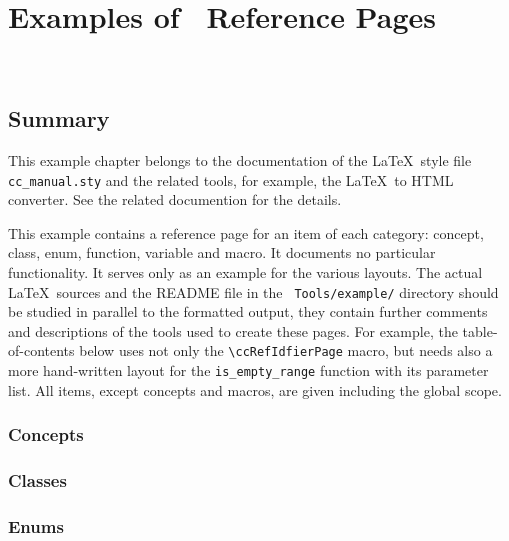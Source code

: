 
\chapter{Examples of \CC\ Reference Pages}
\\

\section*{Summary}

This example chapter belongs to the documentation of the \LaTeX\ style
file {\tt cc\_manual.sty} and the related tools, for example, the
\LaTeX\ to HTML converter. See the related documention for the details.

This example contains a reference page for an item of each category:
concept, class, enum, function, variable and macro. It documents no
particular functionality. It serves only as an example for the various
layouts. The actual \LaTeX\ sources and the README file in the {\tt
  Tools/example/} directory should be studied in parallel to the
formatted output, they contain further comments and descriptions of
the tools used to create these pages. For example, the
table-of-contents below uses not only the \verb+\ccRefIdfierPage+
macro, but needs also a more hand-written layout for the
\verb+is_empty_range+ function with its parameter list.  All items,
except concepts and macros, are given including the global scope.

\subsection*{Concepts}


\subsection*{Classes}


\subsection*{Enums}

